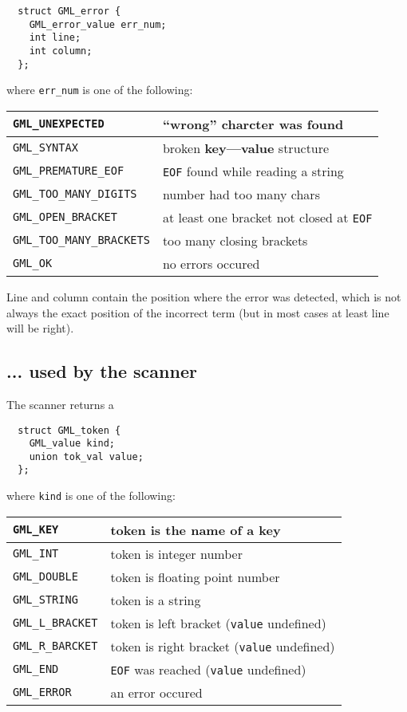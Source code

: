 \documentclass[10pt,oneside,a4paper]{article}
\begin{document}
\begin{verbatim}
  struct GML_error {
    GML_error_value err_num;
    int line;
    int column;
  };
\end{verbatim}
where \verb+err_num+ is one of the following:

\medskip
\begin{tabular}{|l|l|}
  \hline
  \verb+GML_UNEXPECTED+ & ``wrong'' charcter was found \\ \hline
  \verb+GML_SYNTAX+ & broken \textbf{key---value} structure \\ \hline
  \verb+GML_PREMATURE_EOF+ & \verb+EOF+ found while reading a string \\ \hline
  \verb+GML_TOO_MANY_DIGITS+ & number had too many chars \\ \hline
  \verb+GML_OPEN_BRACKET+ & at least one bracket not closed at \verb+EOF+
  \\ \hline
  \verb+GML_TOO_MANY_BRACKETS+ & too many closing brackets \\ \hline
  \verb+GML_OK+ & no errors occured \\ \hline
\end{tabular}

\medskip\noindent
Line and column contain the position where the error was detected, which is not
always the exact position of the incorrect term (but in most cases at least 
line will be right).

\subsection{... used by the scanner}

The scanner returns a 

\begin{verbatim}  
  struct GML_token { 
    GML_value kind;
    union tok_val value;
  };
\end{verbatim}
where \verb+kind+ is one of the following:

\medskip
\begin{tabular}{|l|l|}
  \hline
  \verb+GML_KEY+ & token is the name of a key \\ \hline
  \verb+GML_INT+ & token is integer number \\ \hline
  \verb+GML_DOUBLE+ & token is floating point number \\ \hline
  \verb+GML_STRING+ & token is a string \\ \hline
  \verb+GML_L_BRACKET+ & token is left bracket (\verb+value+ undefined)\\\hline
  \verb+GML_R_BARCKET+&token is right bracket (\verb+value+ undefined)\\\hline
  \verb+GML_END+ & \verb+EOF+ was reached (\verb+value+ undefined) \\ \hline
  \verb+GML_ERROR+ & an error occured \\ \hline
\end{tabular}
\end{document}
